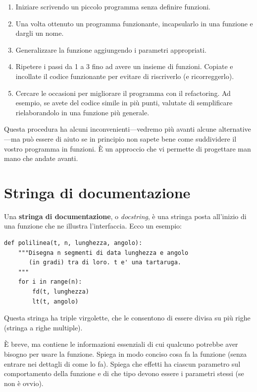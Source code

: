 \documentclass[10pt]{book}
\begin{document}
\begin{enumerate}

\item Iniziare scrivendo un piccolo programma senza definire funzioni.

\item Una volta ottenuto un programma funzionante, incapsularlo in una funzione e dargli un nome.

\item Generalizzare la funzione aggiungendo i parametri appropriati.

\item Ripetere i passi da 1 a 3 fino ad avere un insieme di funzioni. Copiate e incollate il codice funzionante per evitare di riscriverlo (e ricorreggerlo).

\item Cercare le occasioni per migliorare il programma con il refactoring. Ad esempio, se avete del codice simile in più punti, valutate di semplificare rielaborandolo in una funzione più generale.

\end{enumerate}

Questa procedura ha alcuni inconvenienti---vedremo più avanti alcune alternative---ma può essere di aiuto se in principio non sapete bene come suddividere il vostro programma in funzioni. È un approccio che vi permette di progettare man mano che andate avanti.


\section{Stringa di documentazione}
\label{docstring}

Una {\bf stringa di documentazione}, o {\em docstring}, è una stringa posta all'inizio di una funzione che ne illustra l'interfaccia. Ecco un esempio:

\begin{verbatim}
def polilinea(t, n, lunghezza, angolo):
    """Disegna n segmenti di data lunghezza e angolo
       (in gradi) tra di loro. t e' una tartaruga.
    """    
    for i in range(n):
        fd(t, lunghezza)
        lt(t, angolo)
\end{verbatim}
%
Questa stringa ha triple virgolette, che le consentono di essere divisa su più righe (stringa a righe multiple).

È breve, ma contiene le informazioni essenziali di cui qualcuno potrebbe aver bisogno per usare la funzione. Spiega in modo conciso cosa fa la funzione (senza entrare nei dettagli di come lo fa). Spiega che effetti ha ciascun parametro sul comportamento della funzione e di che tipo devono essere i parametri stessi (se non è ovvio).
\end{document}
